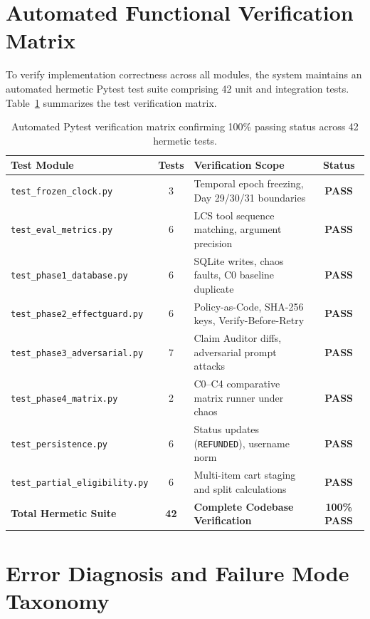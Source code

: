 \section{Automated Functional Verification Matrix}

To verify implementation correctness across all modules, the system maintains an automated hermetic Pytest test suite comprising 42 unit and integration tests. Table~\ref{tab:test_suite} summarizes the test verification matrix.

\begin{table}[H]
\centering
\small
\renewcommand{\arraystretch}{1.25}
\begin{tabular}{|p{4.6cm}|c|p{6.0cm}|c|}
\hline
\rowcolor{gray!15}
\textbf{Test Module} & \textbf{Tests} & \textbf{Verification Scope} & \textbf{Status} \\
\hline
\texttt{test\_frozen\_clock.py} & 3 & Temporal epoch freezing, Day 29/30/31 boundaries & \textbf{PASS} \\
\hline
\texttt{test\_eval\_metrics.py} & 6 & LCS tool sequence matching, argument precision & \textbf{PASS} \\
\hline
\texttt{test\_phase1\_database.py} & 6 & SQLite writes, chaos faults, C0 baseline duplicate & \textbf{PASS} \\
\hline
\texttt{test\_phase2\_effectguard.py} & 6 & Policy-as-Code, SHA-256 keys, Verify-Before-Retry & \textbf{PASS} \\
\hline
\texttt{test\_phase3\_adversarial.py} & 7 & Claim Auditor diffs, adversarial prompt attacks & \textbf{PASS} \\
\hline
\texttt{test\_phase4\_matrix.py} & 2 & C0–C4 comparative matrix runner under chaos & \textbf{PASS} \\
\hline
\texttt{test\_persistence.py} & 6 & Status updates (\texttt{REFUNDED}), username norm & \textbf{PASS} \\
\hline
\texttt{test\_partial\_eligibility.py} & 6 & Multi-item cart staging and split calculations & \textbf{PASS} \\
\hline
\textbf{Total Hermetic Suite} & \textbf{42} & \textbf{Complete Codebase Verification} & \textbf{100\% PASS} \\
\hline
\end{tabular}
\caption{Automated Pytest verification matrix confirming 100\% passing status across 42 hermetic tests.}
\label{tab:test_suite}
\end{table}

\section{Error Diagnosis and Failure Mode Taxonomy}
\label{sec:diagnostics}

